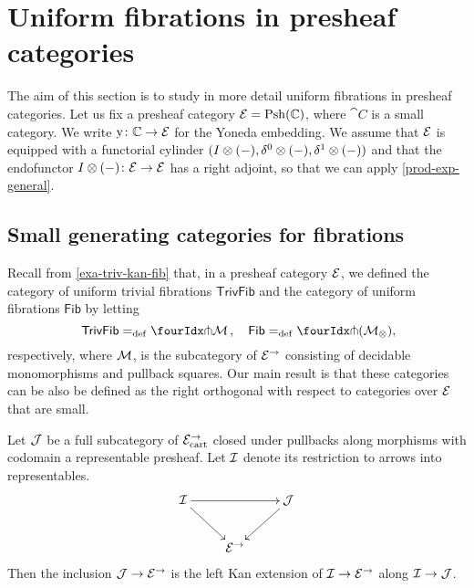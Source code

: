\documentclass[reqno,10pt,a4paper,oneside]{amsart}
\begin{document}
\section{Uniform fibrations in presheaf categories}
\label{sec:unifpc}


The aim of this section is to study in more detail uniform fibrations in presheaf categories.
Let us fix a presheaf category $\catE = \Psh(\cat{C})$, where $\cat{C}$ is a small category.
We write $\yon \co \catC \to \cal{E}$ for the Yoneda embedding.
We assume that $\cal{E}$ is equipped with a functorial cylinder $( \interval \otimes (-), \lcyl \otimes (-), \rcyl \otimes (-))$ and that the endofunctor $ \interval\otimes (-) \co \cal{E} \to \cal{E}$ has a right adjoint, so that we can apply \cref{prod-exp-general}.

\subsection*{Small generating categories for fibrations} Recall from \cref{exa-triv-kan-fib} that, in a presheaf category $\cal{E}$, we defined the category of uniform trivial fibrations
$\mathsf{TrivFib}$ and the category of uniform fibrations $\mathsf{Fib}$ by letting
\[
\mathsf{TrivFib} \defeq \liftr{\cal{M}} \, , \quad \mathsf{Fib} \defeq \liftr{(\cal{M}_\otimes)} \rlap{,}
\]
respectively, where $\cal{M}$, is the subcategory of $\cal{E}^\to$ consisting of decidable monomorphisms and pullback squares.
Our main result is that these categories can be also be defined as the right orthogonal with respect to categories over
$\cal{E}$ that are small.


\begin{lemma} \label{left-kan-extension-of-representables}
Let $\cal{J}$ be a full subcategory of $\catE_{\cart}^\to$ closed under pullbacks along morphisms with codomain a representable presheaf.
Let $\cal{I}$ denote its restriction to arrows into representables.
\[
\xymatrix{
  \cal{I}
  \ar[rr]
  \ar[dr]
&&
  \cal{J}
  \ar[dl]
\\&
  \catE^\to
}
\]
Then the inclusion $\cal{J} \to \catE^\to$ is the left Kan extension of $\cal{I} \to \catE^\to$ along $\cal{I} \to \cal{J}$.
\end{lemma}
\end{document}
